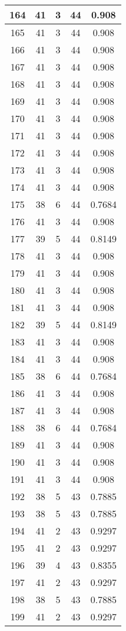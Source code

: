 \documentclass[letterpaper, 12pt]{article}
\begin{document}
\begin{longtable}{|c|c|c|c|c|}
164 & 41 & 3 & 44 & 0.908 \\
\hline
165 & 41 & 3 & 44 & 0.908 \\
\hline
166 & 41 & 3 & 44 & 0.908 \\
\hline
167 & 41 & 3 & 44 & 0.908 \\
\hline
168 & 41 & 3 & 44 & 0.908 \\
\hline
169 & 41 & 3 & 44 & 0.908 \\
\hline
170 & 41 & 3 & 44 & 0.908 \\
\hline
171 & 41 & 3 & 44 & 0.908 \\
\hline
172 & 41 & 3 & 44 & 0.908 \\
\hline
173 & 41 & 3 & 44 & 0.908 \\
\hline
174 & 41 & 3 & 44 & 0.908 \\
\hline
175 & 38 & 6 & 44 & 0.7684 \\
\hline
176 & 41 & 3 & 44 & 0.908 \\
\hline
177 & 39 & 5 & 44 & 0.8149 \\
\hline
178 & 41 & 3 & 44 & 0.908 \\
\hline
179 & 41 & 3 & 44 & 0.908 \\
\hline
180 & 41 & 3 & 44 & 0.908 \\
\hline
181 & 41 & 3 & 44 & 0.908 \\
\hline
182 & 39 & 5 & 44 & 0.8149 \\
\hline
183 & 41 & 3 & 44 & 0.908 \\
\hline
184 & 41 & 3 & 44 & 0.908 \\
\hline
185 & 38 & 6 & 44 & 0.7684 \\
\hline
186 & 41 & 3 & 44 & 0.908 \\
\hline
187 & 41 & 3 & 44 & 0.908 \\
\hline
188 & 38 & 6 & 44 & 0.7684 \\
\hline
189 & 41 & 3 & 44 & 0.908 \\
\hline
190 & 41 & 3 & 44 & 0.908 \\
\hline
191 & 41 & 3 & 44 & 0.908 \\
\hline
192 & 38 & 5 & 43 & 0.7885 \\
\hline
193 & 38 & 5 & 43 & 0.7885 \\
\hline
194 & 41 & 2 & 43 & 0.9297 \\
\hline
195 & 41 & 2 & 43 & 0.9297 \\
\hline
196 & 39 & 4 & 43 & 0.8355 \\
\hline
197 & 41 & 2 & 43 & 0.9297 \\
\hline
198 & 38 & 5 & 43 & 0.7885 \\
\hline
199 & 41 & 2 & 43 & 0.9297 \\
\hline
\end{longtable}
\end{document}
